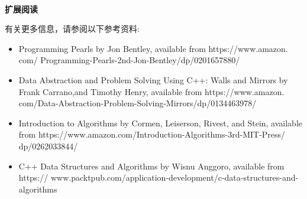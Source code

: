 \noindent\textbf{}\ \par
\textbf{扩展阅读} \ \par
有关更多信息，请参阅以下参考资料: \par

\begin{itemize}
	\item Programming Pearls by Jon Bentley, available from  https:/​/​www.​amazon.​com/	Programming-​Pearls-​2nd-​Jon-​Bentley/​dp/​0201657880/​
	\item Data Abstraction and Problem Solving Using C++: Walls and Mirrors by Frank Carrano,and Timothy Henry, available from  https:/​/​www.​amazon.​com/​Data-Abstraction-​Problem-​Solving-​Mirrors/​dp/​0134463978/​
	\item Introduction to Algorithms by Cormen, Leiserson, Rivest, and Stein, available
	from https:/​/​www.​amazon.​com/​Introduction-​Algorithms-​3rd-​MIT-​Press/​dp/0262033844/​
	\item C++ Data Structures and Algorithms by Wisnu Anggoro, available from  https:/​/
	www.​packtpub.​com/​application-​development/​c-​data-​structures-​and-algorithms
\end{itemize}

\newpage







